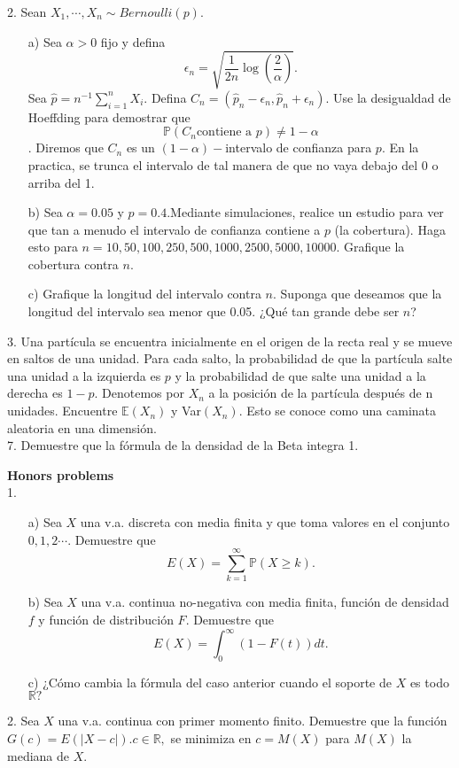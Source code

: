 \documentclass[11pt,letterpaper]{article}
\newcommand{\mP}{\mathbb{P}}
\newcommand{\mE}{\mathbb{E}}
\begin{document}
2. Sean  $X_1,\cdots,X_n\sim Bernoulli(p)$.
\begin{itemize}
\item[a)] Sea $\alpha >0 $ fijo y defina 
$$\epsilon_n = \sqrt{\frac{1}{2n} \log\left(\frac{2}{\alpha}\right)}.$$
Sea $\hat{p}=n^{-1}\sum_{i=1}^n X_i.$ Defina $C_n=(\hat{p}_n-\epsilon_n,\hat{p}_n+\epsilon_n)$. Use la desigualdad de Hoeffding para demostrar que $$\mP(C_n \text{contiene a } p)\neq 1-\alpha$$.
Diremos que $C_n$ es un $(1-\alpha)-$intervalo de confianza para $p$. En la practica, se trunca el intervalo de tal manera de que no vaya debajo del 0 o arriba del 1.

\item[b)] Sea $\alpha=0.05$ y $p=0.4$.Mediante simulaciones, realice un estudio para ver que tan a menudo el intervalo de confianza contiene a $p$ (la cobertura). Haga esto para $n=
10, 50, 100, 250, 500, 1000, 2500, 5000, 10000$. Grafique la cobertura contra $n$.

\item[c)] Grafique la longitud del intervalo contra $n$. Suponga que deseamos que la longitud del intervalo sea menor que 0.05. ¿Qué tan grande debe ser $n$?
\end{itemize}

3. Una partícula se encuentra inicialmente en el origen de la recta real y se mueve en saltos de una unidad. Para cada salto, la probabilidad de que la partícula salte una unidad a la izquierda es $p$ y la probabilidad de que salte una unidad a la derecha es $1-p$. Denotemos por $X_n$ a la posición de la partícula después de n unidades. Encuentre $\mE(X_n)$ y Var$(X_n)$. Esto se conoce como una caminata aleatoria en una dimensión. \\



7. Demuestre que la fórmula de la densidad de la Beta integra 1.


\textbf{Honors problems} \\
1. \begin{itemize}
\item[a)] Sea $X$ una v.a. discreta con media finita y que toma valores en el conjunto $0,1,2\cdots .$ Demuestre que 
$$E(X)=\sum_{k=1}^\infty \mP(X\geq k).$$
\item[b)] Sea $X$ una v.a. continua no-negativa con media finita, función de densidad $f$ y función de distribución $F$. Demuestre que 
$$E(X)=\int_0^\infty (1-F(t))dt.$$

\item[c)] ¿Cómo cambia la fórmula del caso anterior cuando el soporte de $X$ es todo $\mathbb{R}?$
\end{itemize}
2. Sea $X$ una v.a. continua con primer momento finito. Demuestre que la función $G(c)=E(|X-c|). c\in \mathbb{R},$ se minimiza en $c=M(X)$ para $M(X)$ la mediana de $X$.
\end{document}
